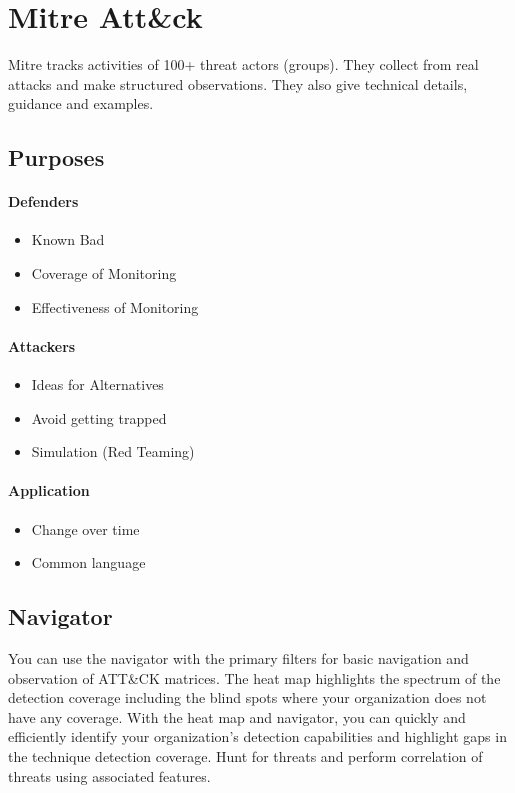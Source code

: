 \section{Mitre Att\&ck}\label{sec:mitre}
Mitre tracks activities of 100+ threat actors (groups).
They collect from real attacks and make structured observations.
They also give technical details, guidance and examples.

\subsection{Purposes}
\paragraph{Defenders}
\begin{itemize}
  \item Known Bad
  \item Coverage of Monitoring
  \item Effectiveness of Monitoring
\end{itemize}

\paragraph{Attackers}
\begin{itemize}
  \item Ideas for Alternatives
  \item Avoid getting trapped
  \item Simulation (Red Teaming)
\end{itemize}

\paragraph{Application}
\begin{itemize}
  \item Change over time
  \item Common language
\end{itemize}

\subsection{Navigator}
You can use the navigator with the primary filters for basic navigation and observation of ATT\&CK matrices. The heat map highlights the spectrum of the detection coverage including the blind spots where your organization does not have any coverage. With the heat map and navigator, you can quickly and efficiently identify your organization's detection capabilities and highlight gaps in the technique detection coverage. Hunt for threats and perform correlation of threats using associated features.